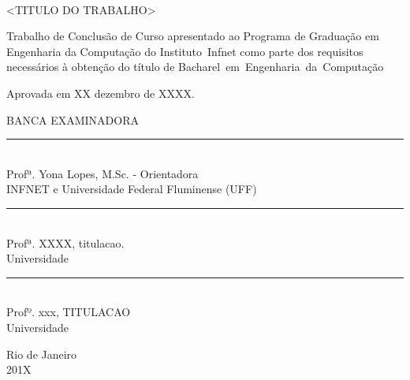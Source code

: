 

\cleardoublepage
\thispagestyle{empty}

\vspace{-60mm}

\begin{center}
   {}\\
   \vspace{7mm}

  <TITULO DO TRABALHO>\\
 \vspace{8mm}  %
\end{center}

\noindent
\begin{flushright}
\begin{minipage}[t]{8cm} 

Trabalho de Conclusão de Curso apresentado ao Programa de Graduação em Engenharia da Computação do \mbox{Instituto Infnet} como parte dos requisitos
necessários à obtenção do título de \mbox{Bacharel em Engenharia da Computação}

\end{minipage}
\end{flushright}
\vspace{ 5mm}  %
\noindent
Aprovada em XX dezembro de XXXX. \\
\begin{flushright}
  \parbox{15cm}
  {
  \begin{center}
  BANCA EXAMINADORA \\
  \vspace{5mm}
  \rule{11cm}{.1mm} \\
	Profª. Yona Lopes, M.Sc. - Orientadora \\ 
	INFNET e Universidade Federal Fluminense (UFF) \\
  \vspace{5mm}
  \rule{11cm}{.1mm} \\
    Profª. XXXX, titulacao.  \\
    Universidade \\
  \vspace{5mm}
  \rule{11cm}{.1mm} \\
    Profº. xxx, TITULACAO \\
    Universidade\\
  \end{center}
  }
\end{flushright}
\begin{center}
  \vspace{4mm} %
 Rio de Janeiro \\
  201X
\end{center}

